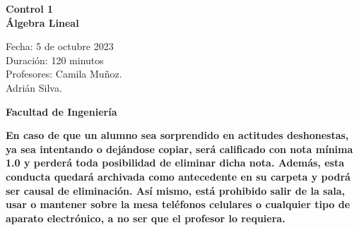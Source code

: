 \documentclass[a4paper]{article}
\begin{document}
\thispagestyle{fancy}
\vspace*{1cm}

\begin{minipage}[r]{12cm}
    \begin{flushright}
    \end{flushright}
\end{minipage}

\begin{center}
\Large{\textbf{Control 1\\ Álgebra Lineal\\ }}
\end{center}
\vspace{1cm}
\begin{minipage}[r]{15cm}
\begin{flushleft}

Fecha: 5 de octubre 2023 \\%
Duración: 120 minutos  \\
Profesores: Camila Muñoz.\\\hspace{1.7cm} Adrián Silva.\\
\end{flushleft}
\end{minipage}
\vspace{2cm}
\begin{center}
\Large{\textbf{Facultad de Ingeniería}}
\end{center}
\vspace{1cm}
\textbf{En caso de que un alumno sea sorprendido en actitudes deshonestas, ya sea intentando o
dejándose copiar, será calificado con nota mínima 1.0 y perderá toda posibilidad de eliminar
dicha nota. Además, esta conducta quedará archivada como antecedente en su carpeta y
podrá ser causal de eliminación.
Así mismo, está prohibido salir de la sala, usar o mantener sobre la mesa teléfonos celulares
o cualquier tipo de aparato electrónico, a no ser que el profesor lo requiera.}\\



\vspace{5cm}
\newpage
\thispagestyle{empty}
\end{document}
